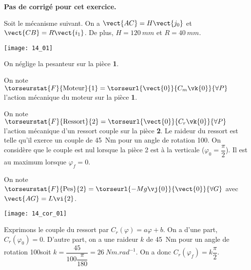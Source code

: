\normalfalse \difficiletrue \tdifficilefalse
\correctiontrue


\setcounter{question}{0}
\ifcorrection
\else
\textbf{Pas de corrigé pour cet exercice.}
\fi

\ifprof
\else
Soit le mécanisme suivant. On a $\vect{AC}=H\vect{j_0}$ et $\vect{CB}=R\vect{i_1}$. De plus, 
$H=\SI{120}{mm}$ et $R=\SI{40}{mm}$. 

\begin{center}
\texttt{[image: 14\_01]}
\end{center}
\fi

On néglige la pesanteur sur la pièce \textbf{1}. 

On note $\torseurstat{F}{\text{Moteur}}{1} = \torseurl{\vect{0}}{C_m\vk{0}}{\forall P}$ l'action mécanique du moteur sur la pièce \textbf{1}.

On note $\torseurstat{F}{\text{Ressort}}{2} = \torseurl{\vect{0}}{C_r\vk{0}}{\forall P}$ l'action mécanique d'un ressort couple sur la pièce \textbf{2}. Le raideur du ressort est telle qu'il exerce un couple de \SI{45}{Nm} pour un angle de rotation 100\degres. On considère que le couple est nul lorsque la pièce 2 est à la verticale ($\varphi_0=\dfrac{\pi}{2}$). Il est au maximum lorsque $\varphi_f=0$.

On note $\torseurstat{F}{\text{Pes}}{2} = \torseurl{-Mg\vj{0}}{\vect{0}}{\forall G}$ avec $\vect{AG}=L\vi{2}$. 

\ifprof
\begin{center}
\texttt{[image: 14\_cor\_01]}
\end{center}
\else
\fi

\ifprof
Exprimons le couple du ressort par $C_r(\varphi)=a\varphi + b$. On a d'une part, $C_r(\varphi_0)=0$. D'autre part, on a une raideur $k$ de \SI{45}{Nm} pour un angle de rotation 100\degres soit $k=\dfrac{45}{100 \dfrac{\pi}{180}} = \SI{26}{Nm.rad^{-1}}$. On a donc  $C_r(\varphi_f)=k \dfrac{\pi}{2}$.


